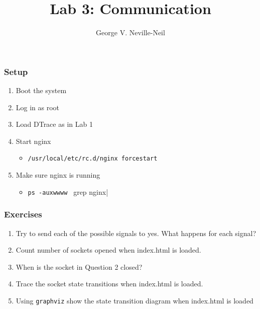 \documentclass[pdftex]{beamer}
\begin{document}

\title{Lab 3: Communication}
\author[shortname]{George V. Neville-Neil}

\begin{frame}[fragile]
  \frametitle{Setup}
  \begin{enumerate}
  \item Boot the system
  \item Log in as root
  \item Load DTrace as in Lab 1
  \item Start nginx
    \begin{itemize}
    \item \verb|/usr/local/etc/rc.d/nginx forcestart|
    \end{itemize}
  \item Make sure nginx is running
    \begin{itemize}
    \item \verb|ps -auxwwww | grep nginx|
    \end{itemize}
  \end{enumerate}
\end{frame}

\begin{frame}[fragile]
  \frametitle{Exercises}
  \begin{enumerate}
  \item Try to send each of the possible signals to yes.  What happens
    for each signal?
  \item Count number of sockets opened when index.html is loaded.
  \item When is the socket in Question 2 closed?
  \item Trace the socket state transitions when index.html is loaded.
  \item Using \texttt{graphviz} show the state transition diagram when
    index.html is loaded
  \end{enumerate}
\end{frame}
\end{document}

